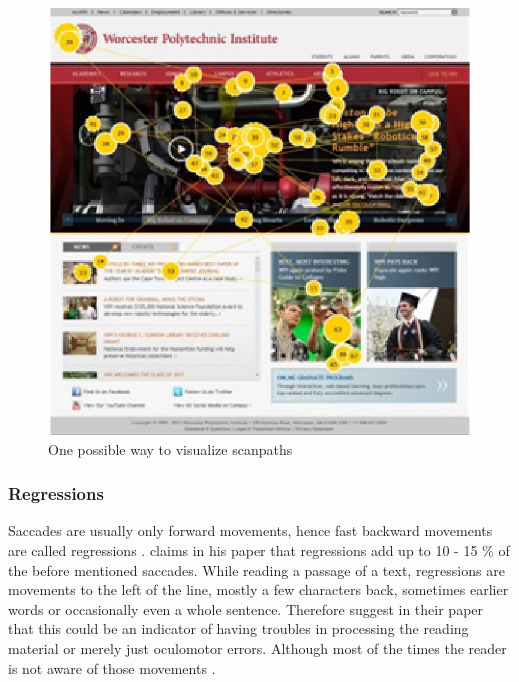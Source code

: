 \begin{figure}[!ht]
    \centering
    \includegraphics[width=1\linewidth]{images/scanpath_djamasbi2014eye.png}
    \caption{
       One possible way to visualize scanpaths \autocite[43]{djamasbi2014eye}
    }
    \label{figure:Scanpath}
\end{figure}

\subsubsection{Regressions}
Saccades are usually only forward movements, hence fast backward movements are called regressions \autocite[]{reichle1998toward}. 
\textcite[]{rayner1998eye} claims in his paper that regressions add up to 10 - 15 \% of the before mentioned saccades.
While reading a passage of a text, regressions are movements to the left of the line, mostly a few characters back, sometimes earlier words or occasionally even a whole sentence. Therefore \textcite[]{kruger2014subtitles} suggest in their paper that this could be an indicator of having troubles in processing the reading material or merely just oculomotor errors. Although most of the times the reader is not aware of those movements \autocite[]{reichle2003ez, biedert2010eyebook}.

